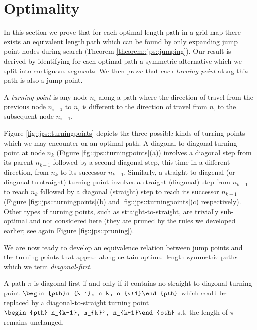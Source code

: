 \section{Optimality}
In this section we prove that for each optimal length path in a grid map there
exists an equivalent length path which can be found by only expanding jump
point nodes during search (Theorem \ref{theorem::jps::jumping}).  Our result is
derived by identifying for each optimal path a symmetric alternative which we
split into contiguous segments. We then prove that each \emph{turning point}
along this path is also a jump point.

\begin{definition}
\label{def::jps::turningpoint}
A \emph{turning point} is any node $n_{i}$ along a path where the direction of
travel from the previous node $n_{i-1}$ to $n_{i}$ is different to the direction
of travel from $n_{i}$ to the subsequent node $n_{i+1}$.
\end{definition}

Figure \ref{fig::jps::turningpoints} depicts the three possible kinds of turning
points which we may encounter on an optimal path. A diagonal-to-diagonal turning
point at node $n_k$ (Figure \ref{fig::jps::turningpoints}(a)) involves a diagonal step
from its parent $n_{k-1}$ followed by a second diagonal step, this time in a
different direction, from $n_{k}$ to its successor $n_{k+1}$.  Similarly, a
straight-to-diagonal (or diagonal-to-straight) turning point involves a straight
(diagonal) step from $n_{k-1}$ to reach $n_{k}$ followed by a diagonal
(straight) step to reach its successor $n_{k+1}$ (Figure
\ref{fig::jps::turningpoints}(b) and \ref{fig::jps::turningpoints}(c) respectively).  
Other types of turning points, such as straight-to-straight, are trivially
sub-optimal and not considered here (they are pruned by the rules we developed
earlier; see again Figure \ref{fig::jps::pruning}).

We are now ready to develop an equivalence relation between
jump points and the turning points that appear along certain optimal length 
symmetric paths which we term \emph{diagonal-first}.
 
\begin{definition}
A path $\pi$ is diagonal-first if and only if it contains no
straight-to-diagonal turning point $\begin{pth}n_{k-1}, n_k, n_{k+1}\end{pth}$
which could be replaced by a diagonal-to-straight turning point $\begin{pth}
n_{k-1}, n_{k}', n_{k+1}\end{pth}$ s.t.  the length of $\pi$ remains
unchanged.
\end{definition}

